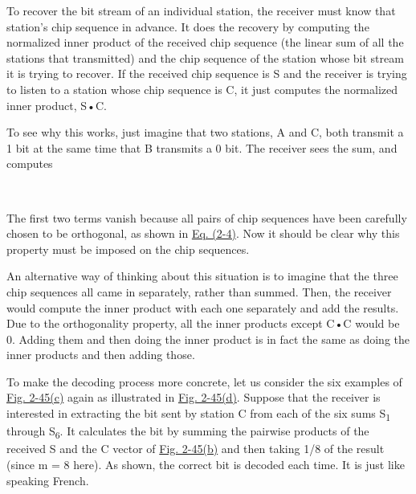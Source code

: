 To recover the bit stream of an individual station, the receiver must
know that station's chip sequence in advance. It does the recovery by
computing the normalized inner product of the received chip sequence
(the linear sum of all the stations that transmitted) and the chip
sequence of the station whose bit stream it is trying to recover. If the
received chip sequence is {S} and the receiver is trying to listen to a
station whose chip sequence is {C}, it just computes the normalized
inner product, {S}•{C}.

To see why this works, just imagine that two stations, {A} and {C}, both
transmit a 1 bit at the same time that {B} transmits a 0 bit. The
receiver sees the sum,
and computes


~

The first two terms vanish because all pairs of chip sequences have been
carefully chosen to be orthogonal, as shown in
\protect\hyperlink{0130661023_ch02lev1sec6.htmlux5cux23ch02eq04}{Eq.
(2-4)}. Now it should be clear why this property must be imposed on the
chip sequences.

An alternative way of thinking about this situation is to imagine that
the three chip sequences all came in separately, rather than summed.
Then, the receiver would compute the inner product with each one
separately and add the results. Due to the orthogonality property, all
the inner products except {C}•{C} would be 0. Adding them and then doing
the inner product is in fact the same as doing the inner products and
then adding those.

To make the decoding process more concrete, let us consider the six
examples of
\protect\hyperlink{0130661023_ch02lev1sec6.htmlux5cux23ch02fig45}{Fig.
2-45(c)} again as illustrated in
\protect\hyperlink{0130661023_ch02lev1sec6.htmlux5cux23ch02fig45}{Fig.
2-45(d)}. Suppose that the receiver is interested in extracting the bit
sent by station {C} from each of the six sums {S}\textsubscript{1}
through {S}\textsubscript{6}. It calculates the bit by summing the
pairwise products of the received {S} and the {C} vector of
\protect\hyperlink{0130661023_ch02lev1sec6.htmlux5cux23ch02fig45}{Fig.
2-45(b)} and then taking 1/8 of the result (since {m} = 8 here). As
shown, the correct bit is decoded each time. It is just like speaking
French.

